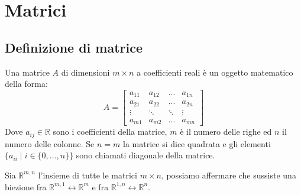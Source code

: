 \documentclass{article}
\begin{document}
\setlength{\parindent}{0pt}

\section{Matrici}
\subsection{Definizione di matrice}
    Una matrice $A$ di dimensioni $m \times n$ a coefficienti reali è un oggetto matematico della forma:
    \[  A =
        \begin{bmatrix}
            a_{11} & a_{12} & ... & a_{1n} \\
            a_{21} & a_{22} & ... & a_{2n} \\
            \vdots & \ddots & \ddots & \vdots \\
            a_{m1} & a_{m2} & ... & a_{mn} 
        \end{bmatrix}
    \]
    Dove $a_{ij} \in \mathbb{R}$ sono i coefficienti della matrice, $m$ è il numero delle righe ed $n$ il numero delle colonne.
    Se $n = m$ la matrice si dice quadrata e gli elementi $\{ a_{ii} \; | \; i \in \{0, ..., n\}\}$ sono chiamati diagonale della matrice. 

    \vspace{10pt}
    Sia $\mathbb{R}^{m, n}$ l'insieme di tutte le matrici $m \times n$, possiamo affermare che sussiste una biezione fra $\mathbb{R}^{m, 1} \leftrightarrow \mathbb{R}^{m}$ e fra $\mathbb{R}^{1, n} \leftrightarrow \mathbb{R}^{n}$.
\end{document}
